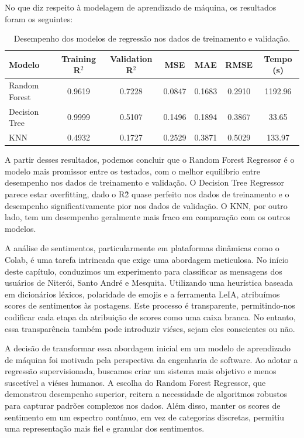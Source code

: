 No que diz respeito à modelagem de aprendizado de máquina, os resultados foram os seguintes:

\begin{table}[h]
	\centering
	\begin{tabular}{|l|c|c|c|c|c|c|}
		\hline
		\textbf{Modelo} & \textbf{Training R$^2$} & \textbf{Validation R$^2$} & \textbf{MSE} & \textbf{MAE} & \textbf{RMSE} & \textbf{Tempo (s)} \\
		\hline
		Random Forest   & 0.9619                  & 0.7228                    & 0.0847       & 0.1683       & 0.2910        & 1192.96            \\
		\hline
		Decision Tree   & 0.9999                  & 0.5107                    & 0.1496       & 0.1894       & 0.3867        & 33.65              \\
		\hline
		KNN             & 0.4932                  & 0.1727                    & 0.2529       & 0.3871       & 0.5029        & 133.97             \\
		\hline
	\end{tabular}
	\caption{Desempenho dos modelos de regressão nos dados de treinamento e validação.}
	\label{tab:model_performance}
\end{table}	

A partir desses resultados, podemos concluir que o Random Forest Regressor é o modelo mais promissor entre os testados, com o melhor equilíbrio entre desempenho nos dados de treinamento e validação. O Decision Tree Regressor parece estar overfitting, dado o R\^2 quase perfeito nos dados de treinamento e o desempenho significativamente pior nos dados de validação. O KNN, por outro lado, tem um desempenho geralmente mais fraco em comparação com os outros modelos.

A análise de sentimentos, particularmente em plataformas dinâmicas como o Colab, é uma tarefa intrincada que exige uma abordagem meticulosa. No início deste capítulo, conduzimos um experimento para classificar as mensagens dos usuários de Niterói, Santo André e Mesquita. Utilizando uma heurística baseada em dicionários léxicos, polaridade de emojis e a ferramenta LeIA, atribuímos scores de sentimentos às postagens. Este processo é transparente, permitindo-nos codificar cada etapa da atribuição de scores como uma caixa branca. No entanto, essa transparência também pode introduzir viéses, sejam eles conscientes ou não.

A decisão de transformar essa abordagem inicial em um modelo de aprendizado de máquina foi motivada pela perspectiva da engenharia de software. Ao adotar a regressão supervisionada, buscamos criar um sistema mais objetivo e menos suscetível a viéses humanos. A escolha do Random Forest Regressor, que demonstrou desempenho superior, reitera a necessidade de algoritmos robustos para capturar padrões complexos nos dados. Além disso, manter os scores de sentimento em um espectro contínuo, em vez de categorias discretas, permitiu uma representação mais fiel e granular dos sentimentos.

